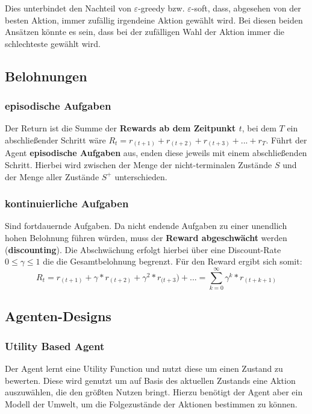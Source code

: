 \documentclass[10pt]{scrartcl}
\begin{document}
Dies unterbindet den Nachteil von $\varepsilon$-greedy bzw. $\varepsilon$-soft, dass, abgesehen von der besten Aktion, immer zufällig irgendeine Aktion gewählt wird. Bei diesen beiden Ansätzen könnte es sein, dass bei der zufälligen Wahl der Aktion immer die schlechteste gewählt wird.

\subsection{Belohnungen}
\subsubsection{episodische Aufgaben}
Der Return ist die Summe der \textbf{Rewards ab dem Zeitpunkt $t$}, bei dem $T$ ein abschließender Schritt wäre  $R_{t}= r_{(t+1)}+ r_{(t+2)}+ r_{(t+3)}+ ... +r_{T}$. Führt der Agent \textbf{episodische Aufgaben} aus, enden diese jeweils mit einem abschließenden Schritt. Hierbei wird zwischen der Menge der nicht-terminalen Zustände $S$ und der Menge aller Zustände $S^{+}$ unterschieden.

\subsubsection{kontinuierliche Aufgaben}
Sind fortdauernde Aufgaben. Da nicht endende Aufgaben zu einer unendlich hohen Belohnung führen würden, muss der \textbf{Reward abgeschwächt} werden (\textbf{discounting}). Die Abschwächung erfolgt hierbei über eine Discount-Rate $0 \leq \gamma  \leq 1$ die die Gesamtbelohnung begrenzt. Für den Reward ergibt sich somit: 
\begin{equation}
R_{t}= r_{(t+1)}+ \gamma*r_{(t+2)}+ \gamma^2*r_{(t+3})+ ... = \sum_{k=0}^\infty \gamma^{k}* r_{(t+k+1)}
\end{equation}

\subsection{Agenten-Designs}
\subsubsection{Utility Based Agent}
Der Agent lernt eine \glqq Utility Function\grqq\xspace und nutzt diese um einen Zustand zu bewerten. Diese wird genutzt um auf Basis des aktuellen Zustands eine Aktion auszuwählen, die den größten Nutzen bringt. Hierzu benötigt der Agent aber ein Modell der Umwelt, um die Folgezustände der Aktionen bestimmen zu können.
\end{document}
